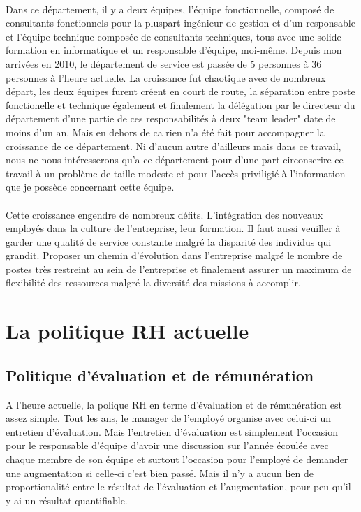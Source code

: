 \paragraph*{}Dans ce département, il y a deux équipes, l'équipe fonctionnelle, composé de consultants fonctionnels pour la pluspart ingénieur de gestion et d'un responsable et l'équipe technique composée de consultants techniques, tous avec une solide formation en informatique et un responsable d'équipe, moi-même. Depuis mon arrivées en 2010, le département de service est passée de 5 personnes à 36 personnes à l'heure actuelle. La croissance fut chaotique avec de nombreux départ, les deux équipes furent créent en court de route, la séparation entre poste fonctionelle et technique également et finalement la délégation par le directeur du département d'une partie de ces responsabilités à deux "team leader" date de moins d'un an. Mais en dehors de ca rien n'a été fait pour accompagner la croissance de ce département. Ni d'aucun autre d'ailleurs mais dans ce travail, nous ne nous intéresserons qu'a ce département pour d'une part circonscrire ce travail à un problème de taille modeste et pour l'accès priviligié à l'information que je possède concernant cette équipe. 


\paragraph*{}Cette croissance engendre de nombreux défits. L'intégration des nouveaux employés dans la culture de l'entreprise, leur formation. Il faut aussi veuiller à garder une qualité de service constante malgré la disparité des individus qui grandit. Proposer un chemin d'évolution dans l'entreprise malgré le nombre de postes très restreint au sein de l'entreprise et finalement assurer un maximum de flexibilité des ressources malgré la diversité des missions à accomplir. 

\section{La politique RH actuelle}
\subsection{Politique d'évaluation et de rémunération} 
A l'heure actuelle, la polique RH en terme d'évaluation et de rémunération est assez simple. Tout les ans, le manager de l'employé organise avec celui-ci un entretien d'évaluation. Mais l'entretien d'évaluation est simplement l'occasion pour le responsable d'équipe d'avoir une discussion sur l'année écoulée avec chaque membre de son équipe et surtout l'occasion pour l'employé de demander une augmentation si celle-ci c'est bien passé. Mais il n'y a aucun lien de proportionalité entre le résultat de l'évaluation et l'augmentation, pour peu qu'il y ai un résultat quantifiable.

